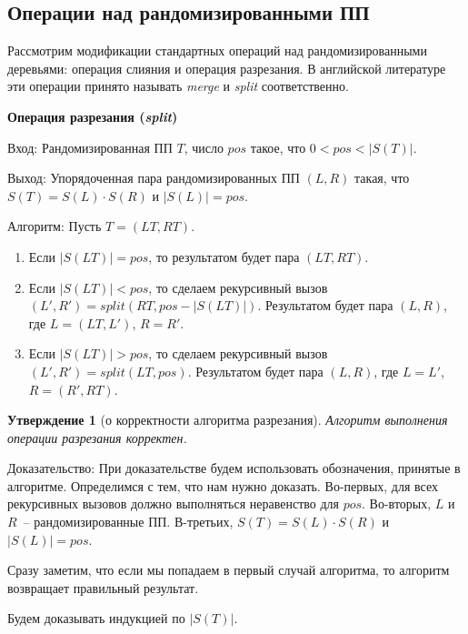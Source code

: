 \documentclass[14pt]{article}
\newtheorem{claim}{Утверждение}[section]
\begin{document}
\subsection{Операции над рандомизированными ПП}

Рассмотрим модификации стандартных операций над рандомизированными деревьями: операция слияния и операция разрезания.
В английской литературе эти операции принято называть \emph{merge} и \emph{split} соответственно.

{\bf Операция разрезания (\emph{split})}

{\sc Вход:} Рандомизированная ПП $T$, число $pos$ такое, что $0 < pos < \left|S(T)\right|$.

{\sc Выход:} Упорядоченная пара рандомизированных ПП $(L, R)$ такая, что
$S(T) = S(L) \cdot S(R)$ и $\left|S(L)\right| = pos$.

{\sc Алгоритм:} Пусть $T = (LT, RT)$.
\begin{enumerate}
	\item Если $\left|S(LT)\right| = pos$, то результатом будет пара $(LT, RT)$.
	\item Если $\left|S(LT)\right| < pos$, то сделаем рекурсивный вызов \newline
	$(L', R') = split(RT, pos - \left|S(LT)\right|)$. Результатом будет пара $(L, R)$,
	где $L = (LT, L')$, $R = R'$.
	\item Если $\left|S(LT)\right| > pos$, то сделаем рекурсивный вызов \newline
	$(L', R') = split(LT, pos)$. Результатом будет пара $(L, R)$,
	где $L = L'$, $R = (R', RT)$.
\end{enumerate}

\begin{claim}[о корректности алгоритма разрезания]
	Алгоритм выполнения операции разрезания корректен.
\end{claim}

{\sc Доказательство:} При доказательстве будем использовать обозначения,
принятые в алгоритме. Определимся с тем, что нам нужно доказать.
Во-первых, для всех рекурсивных вызовов должно выполняться неравенство для $pos$.
Во-вторых, $L$ и $R$~-- рандомизированные ПП.
В-третьих, $S(T) = S(L) \cdot S(R)$ и $\left|S(L)\right| = pos$.

Сразу заметим, что если мы попадаем в первый случай алгоритма, то алгоритм
возвращает правильный результат.

Будем доказывать индукцией по $\left|S(T)\right|$.
\end{document}
